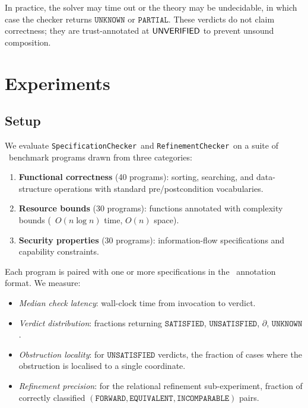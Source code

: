 \documentclass[11pt]{article}
\newcommand{\SAT}{\texttt{SATISFIED}}               %
\newcommand{\UNSAT}{\texttt{UNSATISFIED}}           %
\newcommand{\PARTIAL}{\texttt{PARTIAL}}             %
\newcommand{\UNKNOWN}{\texttt{UNKNOWN}}             %
\newcommand{\SpecificationChecker}{\texttt{SpecificationChecker}}
\newcommand{\RefinementChecker}{\texttt{RefinementChecker}}
\begin{document}
In practice, the solver may time out or the theory may be undecidable,
in which case the checker returns $\UNKNOWN$ or $\PARTIAL$.  These
verdicts do not claim correctness; they are trust-annotated at
$\mathsf{UNVERIFIED}$ to prevent unsound composition.

\section{Experiments}\label{sec:experiments}

\subsection{Setup}\label{sec:exp-setup}

We evaluate \SpecificationChecker\ and \RefinementChecker\ on a suite
of \numspec\ benchmark programs drawn from three categories:
\begin{enumerate}[leftmargin=2em,label=(\roman*)]
  \item \textbf{Functional correctness} (40 programs):
        sorting, searching, and data-structure operations with
        standard pre/postcondition vocabularies.
  \item \textbf{Resource bounds} (30 programs):
        functions annotated with complexity bounds
        (\eg\ $O(n \log n)$ time, $O(n)$ space).
  \item \textbf{Security properties} (30 programs):
        information-flow specifications and capability constraints.
\end{enumerate}
Each program is paired with one or more specifications in the
\JuGeo\ annotation format.  We measure:
\begin{itemize}[leftmargin=2em]
  \item \emph{Median check latency}: wall-clock time from invocation
        to verdict.
  \item \emph{Verdict distribution}: fractions returning $\SAT$,
        $\UNSAT$, $\partial$, $\UNKNOWN$.
  \item \emph{Obstruction locality}: for $\UNSAT$ verdicts, the
        fraction of cases where the obstruction is localised to a
        single coordinate.
  \item \emph{Refinement precision}: for the relational refinement
        sub-experiment, fraction of correctly classified
        $(\texttt{FORWARD},\texttt{EQUIVALENT},\texttt{INCOMPARABLE})$
        pairs.
\end{itemize}
\end{document}
